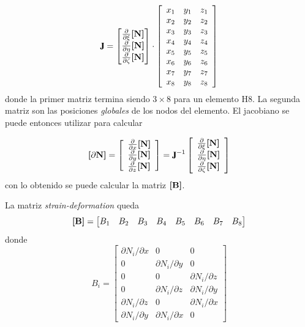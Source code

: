 \begin{equation}
\jac = \begin{bmatrix}
\frac{\partial}{\partial \xi} \MN \\
\frac{\partial}{\partial \eta} \MN \\
\frac{\partial}{\partial \zeta} \MN 
\end{bmatrix}
\cdot 
\left[\begin{array}{lll}{x_{1}} & {y_{1}} & {z_{1}} \\ {x_{2}} & {y_{2}} & {z_{2}} \\ {x_{3}} & {y_{3}} & {z_{3}} \\ {x_{4}} & {y_{4}} & {z_{4}} \\ {x_{5}} & {y_{5}} & {z_{5}} \\ {x_{6}} & {y_{6}} & {z_{6}} \\ {x_{7}} & {y_{7}} & {z_{7}} \\ {x_{8}} & {y_{8}} & {z_{8}}\end{array}\right]
\end{equation}
donde la primer matriz termina siendo $3\times8$ para un elemento H8. La segunda matriz son las posiciones \textit{globales} de los nodos del elemento. El jacobiano se puede entonces utilizar para calcular

\begin{equation}
\Mme{\partial N}=\left[\begin{array}{l} \frac{\partial}{\partial x}\MN  \\ \frac{\partial}{\partial y} \MN  \\ \frac{\partial}{\partial z} \MN  \end{array}\right]=\jac^{-1}\left[\begin{array}{l}\frac{\partial}{\partial \xi} \MN \\
\frac{\partial}{\partial \eta} \MN \\ 
\frac{\partial}{\partial \zeta} \MN \end{array}\right]
\end{equation}
con lo obtenido se puede calcular la matriz $\boldsymbol{[}\mathbf{B} \boldsymbol{]}$.

La matriz \textit{strain-deformation} queda
\[
\boldsymbol{[}\mathbf{B} \boldsymbol{]} = \begin{bmatrix}
B_1 &B_2 &B_3 &B_4 &B_5 &B_6 &B_7 &B_8
\end{bmatrix}
\]
donde
\begin{equation}
B_{i}=\left[\begin{array}{ccc}{\partial N_{i} / \partial x} & {0} & {0} \\ {0} & {\partial N_{i} / \partial y} & {0} \\ {0} & {0} & {\partial N_{i} / \partial z} \\ {0} & {\partial N_{i} / \partial z} & {\partial N_{i} / \partial y} \\ {\partial N_{i} / \partial z} & {0} & {\partial N_{i} / \partial x} \\ {\partial N_{i} / \partial y} & {\partial N_{i} / \partial x} & {0}\end{array}\right]
\end{equation}

